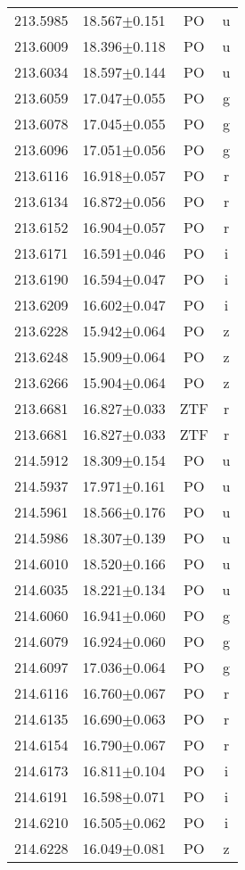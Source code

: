 \begin{table}
\begin{tabular}{cccc}
213.5985 & 18.567$\pm$0.151 & PO & u \\
213.6009 & 18.396$\pm$0.118 & PO & u \\
213.6034 & 18.597$\pm$0.144 & PO & u \\
213.6059 & 17.047$\pm$0.055 & PO & g \\
213.6078 & 17.045$\pm$0.055 & PO & g \\
213.6096 & 17.051$\pm$0.056 & PO & g \\
213.6116 & 16.918$\pm$0.057 & PO & r \\
213.6134 & 16.872$\pm$0.056 & PO & r \\
213.6152 & 16.904$\pm$0.057 & PO & r \\
213.6171 & 16.591$\pm$0.046 & PO & i \\
213.6190 & 16.594$\pm$0.047 & PO & i \\
213.6209 & 16.602$\pm$0.047 & PO & i \\
213.6228 & 15.942$\pm$0.064 & PO & z \\
213.6248 & 15.909$\pm$0.064 & PO & z \\
213.6266 & 15.904$\pm$0.064 & PO & z \\
213.6681 & 16.827$\pm$0.033 & ZTF & r \\
213.6681 & 16.827$\pm$0.033 & ZTF & r \\
214.5912 & 18.309$\pm$0.154 & PO & u \\
214.5937 & 17.971$\pm$0.161 & PO & u \\
214.5961 & 18.566$\pm$0.176 & PO & u \\
214.5986 & 18.307$\pm$0.139 & PO & u \\
214.6010 & 18.520$\pm$0.166 & PO & u \\
214.6035 & 18.221$\pm$0.134 & PO & u \\
214.6060 & 16.941$\pm$0.060 & PO & g \\
214.6079 & 16.924$\pm$0.060 & PO & g \\
214.6097 & 17.036$\pm$0.064 & PO & g \\
214.6116 & 16.760$\pm$0.067 & PO & r \\
214.6135 & 16.690$\pm$0.063 & PO & r \\
214.6154 & 16.790$\pm$0.067 & PO & r \\
214.6173 & 16.811$\pm$0.104 & PO & i \\
214.6191 & 16.598$\pm$0.071 & PO & i \\
214.6210 & 16.505$\pm$0.062 & PO & i \\
214.6228 & 16.049$\pm$0.081 & PO & z \\

\end{tabular}
\end{table}
